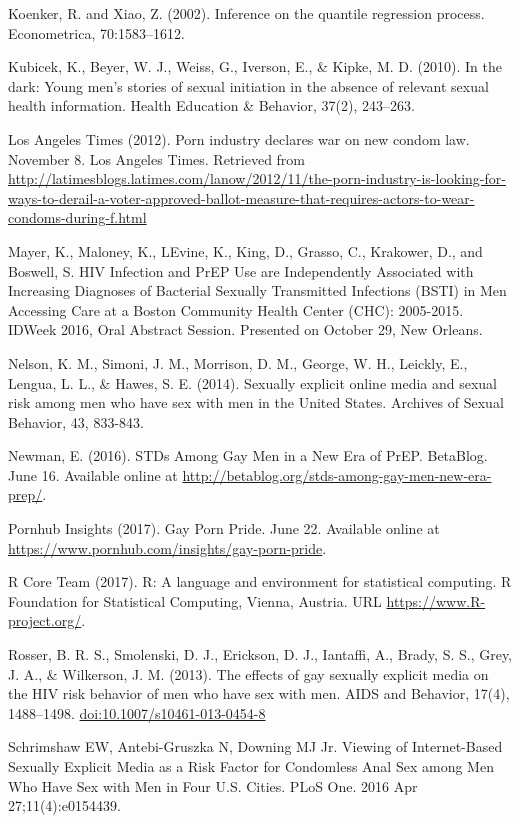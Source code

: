 \documentclass[]{article}
\begin{document}
Koenker, R. and Xiao, Z. (2002). Inference on the quantile regression
process. Econometrica, 70:1583--1612.

Kubicek, K., Beyer, W. J., Weiss, G., Iverson, E., \& Kipke, M. D.
(2010). In the dark: Young men's stories of sexual initiation in the
absence of relevant sexual health information. Health Education \&
Behavior, 37(2), 243--263.

Los Angeles Times (2012). Porn industry declares war on new condom law.
November 8. Los Angeles Times. Retrieved from
\url{http://latimesblogs.latimes.com/lanow/2012/11/the-porn-industry-is-looking-for-ways-to-derail-a-voter-approved-ballot-measure-that-requires-actors-to-wear-condoms-during-f.html}

Mayer, K., Maloney, K., LEvine, K., King, D., Grasso, C., Krakower, D.,
and Boswell, S. HIV Infection and PrEP Use are Independently Associated
with Increasing Diagnoses of Bacterial Sexually Transmitted Infections
(BSTI) in Men Accessing Care at a Boston Community Health Center (CHC):
2005-2015. IDWeek 2016, Oral Abstract Session. Presented on October 29,
New Orleans.

Nelson, K. M., Simoni, J. M., Morrison, D. M., George, W. H., Leickly,
E., Lengua, L. L., \& Hawes, S. E. (2014). Sexually explicit online
media and sexual risk among men who have sex with men in the United
States. Archives of Sexual Behavior, 43, 833-843.

Newman, E. (2016). STDs Among Gay Men in a New Era of PrEP. BetaBlog.
June 16. Available online at
\url{http://betablog.org/stds-among-gay-men-new-era-prep/}.

Pornhub Insights (2017). Gay Porn Pride. June 22. Available online at
\url{https://www.pornhub.com/insights/gay-porn-pride}.

R Core Team (2017). R: A language and environment for statistical
computing. R Foundation for Statistical Computing, Vienna, Austria. URL
\url{https://www.R-project.org/}.

Rosser, B. R. S., Smolenski, D. J., Erickson, D. J., Iantaffi, A.,
Brady, S. S., Grey, J. A., \& Wilkerson, J. M. (2013). The effects of
gay sexually explicit media on the HIV risk behavior of men who have sex
with men. AIDS and Behavior, 17(4), 1488--1498.
\url{doi:10.1007/s10461-013-0454-8}

Schrimshaw EW, Antebi-Gruszka N, Downing MJ Jr. Viewing of
Internet-Based Sexually Explicit Media as a Risk Factor for Condomless
Anal Sex among Men Who Have Sex with Men in Four U.S. Cities. PLoS One.
2016 Apr 27;11(4):e0154439.
\end{document}
